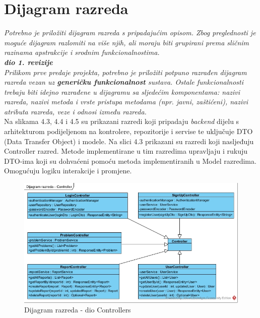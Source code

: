 \eject


\section{Dijagram razreda}

\textit{Potrebno je priložiti dijagram razreda s pripadajućim opisom. Zbog preglednosti je moguće dijagram razlomiti na više njih, ali moraju biti grupirani prema sličnim razinama apstrakcije i srodnim funkcionalnostima.}\\

\textbf{\textit{dio 1. revizije}}\\

\textit{Prilikom prve predaje projekta, potrebno je priložiti potpuno razrađen dijagram razreda vezan uz \textbf{generičku funkcionalnost} sustava. Ostale funkcionalnosti trebaju biti idejno razrađene u dijagramu sa sljedećim komponentama: nazivi razreda, nazivi metoda i vrste pristupa metodama (npr. javni, zaštićeni), nazivi atributa razreda, veze i odnosi između razreda.}\\

Na slikama 4.3, 4.4 i 4.5 su prikazani razredi koji pripadaju \textit{backend} dijelu 
s arhitekturom podijeljenom na kontrolere, repozitorije i servise te uključuje DTO 
(Data Transfer Object) i modele. \newline
Na slici 4.3 prikazani su razredi koji nasljeđuju Controller razred. Metode implementirane
u tim razredima upravljaju i rukuju DTO-ima koji su dohvaćeni pomoću metoda implementiranih
u Model razredima. Omogućuju logiku interakcije i promjene.

\begin{figure}[H]
	\includegraphics[scale=0.60]{slike/DR-controller} %
	\centering
	\caption{Dijagram razreda - dio Controllers}
	\label{fig:DijagramRazredaControllers}
\end{figure}

